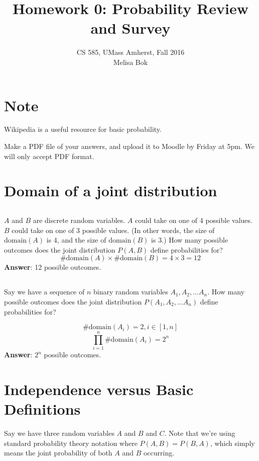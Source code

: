 \documentclass[11pt,letterpaper]{article}
\title{
    Homework 0: Probability Review and Survey
}
\author{CS 585, UMass Amherst, Fall 2016\\Melisa Bok
}
\date{}
\theoremstyle{definition}
\begin{document}
\maketitle

\newcommand{\spaceplz}{\vspace{1in}}

\section*{Note}

Wikipedia is a useful resource for basic probability.

Make a PDF file of your answers, and upload it to Moodle by Friday at 5pm.  We will only accept PDF format.

\section{Domain of a joint distribution}

\subsection{}

$A$ and $B$ are discrete random variables.  $A$ could take on one of 4 possible values.  $B$ could take on one of 3 possible values.  (In other words, the size of $\text{domain}(A)$ is 4, and the size of $\text{domain}(B)$ is 3.)  How many possible outcomes does the joint distribution $P(A,B)$ define probabilities for?
\[
\# \text{domain}(A) \times \# \text{domain}(B) = 4 \times 3 = 12
\]
\textbf{Answer}: 12 possible outcomes.

\subsection{}
Say we have a sequence of $n$ binary random variables
$A_1, A_2,\ldots A_n$.  How many possible outcomes
does the joint distribution $P(A_1,A_2,\ldots A_n)$ define probabilities for?

\[
\# \text{domain}(A_i) = 2, i \in [1,n]
\]
\[
\prod_{i=1}^{n} \# \text{domain}(A_i) = 2^n
\]
\textbf{Answer}: $2^n$ possible outcomes.

\section{Independence versus Basic Definitions}

Say we have three random variables $A$ and $B$ and $C$.
Note that we're using standard probability theory notation where $P(A,B)=P(B,A)$,
which simply means the joint probability of both $A$ and $B$ occurring.
\end{document}
